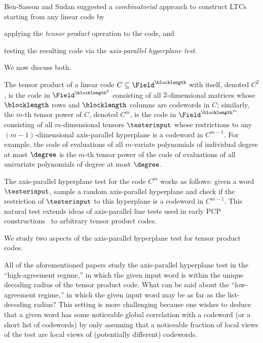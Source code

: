 \documentclass{toc}
\theoremstyle{plain}
\begin{document}
Ben-Sasson and Sudan \cite{Ben-SassonS06} suggested a \emph{combinatorial} approach to construct LTCs starting from any linear code by
\begin{inparaenum}[(i)]
 \item applying the \emph{tensor product} operation \cite{Wolf65,WolfE63} to the code, and
 \item testing the resulting code via the \emph{axis-parallel hyperplane test}.
\end{inparaenum}
We now discuss both.

%
%
The tensor product of a linear code $C \subseteq \Field^{\blocklength}$ with itself,    %
denoted $C^{2}$, is the code in $\Field^{\blocklength^{2}}$ consisting of all $2$-dimensional matrices whose $\blocklength$ rows and $\blocklength$ columns are codewords in $C$; similarly,
%
the $m$-th tensor power                                                         %
of $C$, denoted $C^{m}$, is the code in $\Field^{\blocklength^m}$ consisting of all $m$-dimensional
%
tensors     %
$\testerinput$ whose restrictions to any $(m-1)$-dimensional axis-parallel hyperplane is a codeword in $C^{m-1}$. For example, the code of evaluations of all $m$-variate polynomials of individual degree at most $\degree$
%
is the $m$-th tensor power                                                      %
of the code of evaluations of all univariate polynomials of degree at most $\degree$.

The axis-parallel hyperplane test for the code $C^{m}$ works as follows: given a word $\testerinput$, sample a random axis-parallel hyperplane and check if the restriction of $\testerinput$ to this hyperplane is a codeword in $C^{m-1}$. This natural test extends ideas of axis-parallel line tests used in early PCP constructions~\cite{BabaiFL91,BabaiFLS91, AroraS98} to arbitrary tensor product codes.

We study two aspects of the axis-parallel hyperplane test for tensor product codes.

All of the aforementioned
%
papers  %
study the axis-parallel hyperplane test in the ``high-agreement regime,'' in which the given input word is within the unique decoding radius of the tensor product code. What can be said about the ``low-agreement regime,'' in which the given input word may be as far as the list-decoding radius? This setting is more challenging because one wishes to deduce that a given word has some noticeable global correlation with a codeword (or a short list of codewords) by only assuming that a noticeable fraction of local views of the test are local views of (potentially different) codewords.
\end{document}
